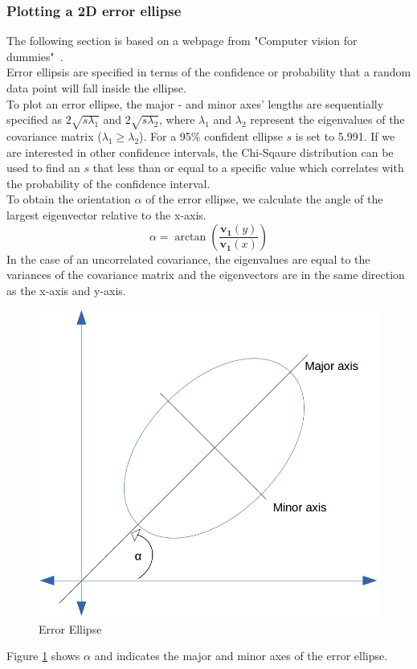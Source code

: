 \documentclass[12pt,oneside,openany,a4paper, %
afrikaans,english,
]{memoir}
\numberwithin{equation}{chapter}
\begin{document}
\subsubsection{Plotting a 2D error ellipse}
The following section is based on a webpage from "Computer vision for dummies"~\cite{draw_ellipse}.\\
Error ellipsis are specified in terms of the confidence or probability that a random data point will fall inside the ellipse.\\To plot an error ellipse, the major - and minor axes' lengths are sequentially specified as $2\sqrt{s\lambda_1}$ and $2\sqrt{s\lambda_2}$, where $\lambda_1$ and $\lambda_2$ represent the eigenvalues of the covariance matrix ($\lambda_1 \geq \lambda_2$). For a 95\% confident ellipse $s$ is set to 5.991. If we are interested in other confidence intervals, the Chi-Sqaure distribution can be used to find an $s$ that less than or equal to a specific value which correlates with the probability of the confidence interval.\\
To obtain the orientation $\alpha$ of the error ellipse, we calculate the angle of the largest eigenvector relative to the x-axis.
\begin{equation}
\alpha = \arctan\left(\frac{\bm{v_1}(y)}{\bm{v_1}(x)}\right)
\end{equation}
In the case of an uncorrelated covariance, the eigenvalues are equal to the variances of the covariance matrix and the eigenvectors are in the same direction as the x-axis and y-axis.
\begin{figure}
  \includegraphics[width=0.6\linewidth]{Figures/e_ellipse.png}
  \centering
  \caption{Error Ellipse}
  \label{fig:e_ellipse}
\end{figure}
Figure \ref{fig:e_ellipse} shows $\alpha$ and indicates the major and minor axes of the error ellipse.
\end{document}
